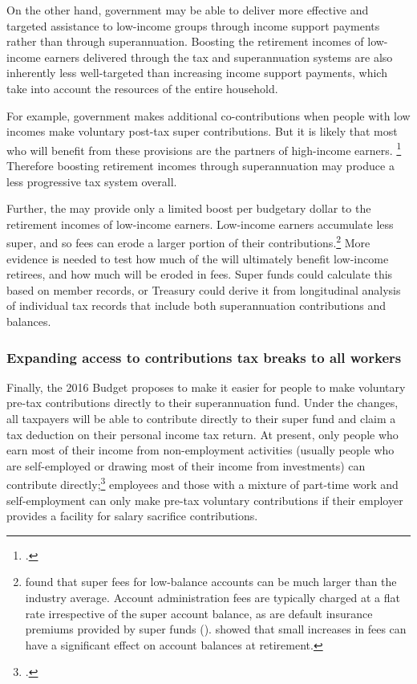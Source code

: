 \documentclass[continuous]{grattan}\usepackage[]{graphicx}\usepackage[]{color}
\begin{document}
On the other hand, government may be able to deliver more effective and targeted assistance to low-income groups through income support payments rather than through superannuation. 
Boosting the retirement incomes of low-income earners delivered through the tax and superannuation systems are also inherently less well-targeted than increasing income support payments, which take into account the resources of the entire household. 

For example, government makes additional co-contributions when people with low incomes make voluntary post-tax super contributions. 
But it is likely that most who will benefit from these provisions are the partners of high-income earners.%
\footcite[][4]{Grattan-submission-2016-Senate-Inq-econ-security-women-retirement} %
Therefore boosting retirement incomes through superannuation may produce a less progressive tax system overall. 

Further, the \LISTO{} may provide only a limited boost per budgetary dollar to the retirement incomes of low-income earners. %
Low-income earners accumulate less super, and so fees can erode a larger portion of their contributions.\footnote{%
\textcite{Rice-Warner-2012-Super-fees-research} found that super fees for low-balance accounts can be much larger than the industry average. 
Account administration fees are typically charged at a flat rate irrespective of the super account balance, as are default insurance premiums provided by super funds (\textcites{ASIC-2016-Super-fees}{Canstar-2016-Guide-to-understanding-super-fees}). 
\textcite[][8]{Minifie-Savage-Cameron-2014-Super-sting} showed that small increases in fees can have a significant effect on account balances at retirement. 
}   
More evidence is needed to test how much of the \LISTO{} will ultimately benefit low-income retirees, and how much will be eroded in fees.
Super funds could calculate this based on member records, or Treasury could derive it from longitudinal analysis of individual tax records that include both superannuation contributions and balances.



\subsubsection{Expanding access to contributions tax breaks to all workers}\label{expanding-access-to-contributions-tax-breaks-to-all-workers}
Finally, the 2016 Budget proposes to make it easier for people to make voluntary pre-tax contributions directly to their superannuation fund. 
Under the changes, all taxpayers will be able to contribute directly to their super fund and claim a tax deduction on their personal income tax return. 
At present, only people who earn most of their income from non-employment activities (usually people who are self-employed or drawing most of their income from investments) can contribute directly;\footcite{ATO-2016-Claiming-deductions-for-pers-super-contr} %
employees and those with a mixture of part-time work and self-employment can only make pre-tax voluntary contributions if their employer provides a facility for salary sacrifice contributions.
\end{document}
